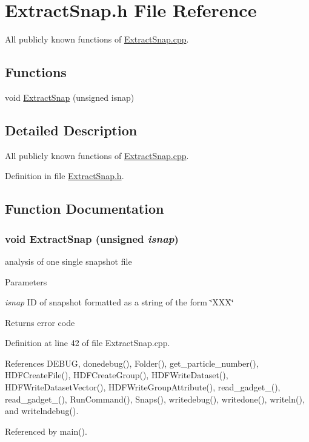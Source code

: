\section{ExtractSnap.h File Reference}
\label{ExtractSnap_8h}


All publicly known functions of \hyperlink{ExtractSnap_8cpp}{ExtractSnap.cpp}.  


\subsection*{Functions}
\begin{DoxyCompactItemize}
\item 
void \hyperlink{ExtractSnap_8h_a153efd2d127e586a6fbb2a050f440c06}{ExtractSnap} (unsigned isnap)
\end{DoxyCompactItemize}


\subsection{Detailed Description}
All publicly known functions of \hyperlink{ExtractSnap_8cpp}{ExtractSnap.cpp}. 

Definition in file \hyperlink{ExtractSnap_8h_source}{ExtractSnap.h}.



\subsection{Function Documentation}
\subsubsection[{ExtractSnap}]{\setlength{\rightskip}{0pt plus 5cm}void ExtractSnap (unsigned {\em isnap})}\label{ExtractSnap_8h_a153efd2d127e586a6fbb2a050f440c06}
analysis of one single snapshot file 
\begin{DoxyParams}{Parameters}
\item[{\em isnap}]ID of snapshot formatted as a string of the form \char`\"{}XXX\char`\"{} \end{DoxyParams}
\begin{DoxyReturn}{Returns}
error code 
\end{DoxyReturn}


Definition at line 42 of file ExtractSnap.cpp.



References DEBUG, donedebug(), Folder(), get\_\-particle\_\-number(), HDFCreateFile(), HDFCreateGroup(), HDFWriteDataset(), HDFWriteDatasetVector(), HDFWriteGroupAttribute(), read\_\-gadget\_(), read\_\-gadget\_(), RunCommand(), Snaps(), writedebug(), writedone(), writeln(), and writelndebug().



Referenced by main().


